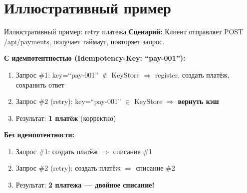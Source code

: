 \documentclass[aspectratio=169]{beamer}
\begin{document}
\section{Иллюстративный пример}
\begin{frame}{Иллюстративный пример: retry платежа}
\textbf{Сценарий:} Клиент отправляет POST /api/payments, получает таймаут, повторяет запрос.

\vspace{3mm}
\textbf{С идемпотентностью (Idempotency-Key: ``pay-001''):}
\begin{enumerate}
    \footnotesize
    \item Запрос \#1: key=``pay-001'' $\notin$ KeyStore $\Rightarrow$ register, создать платёж, сохранить ответ
    \item Запрос \#2 (retry): key=``pay-001'' $\in$ KeyStore $\Rightarrow$ \textbf{вернуть кэш}
    \item Результат: \textbf{1 платёж} (корректно)
\end{enumerate}

\vspace{3mm}
\textbf{Без идемпотентности:}
\begin{enumerate}
    \footnotesize
    \item Запрос \#1: создать платёж $\Rightarrow$ списание \#1
    \item Запрос \#2 (retry): создать платёж $\Rightarrow$ списание \#2
    \item Результат: \textbf{2 платежа --- двойное списание!}
\end{enumerate}
\end{frame}
\end{document}
